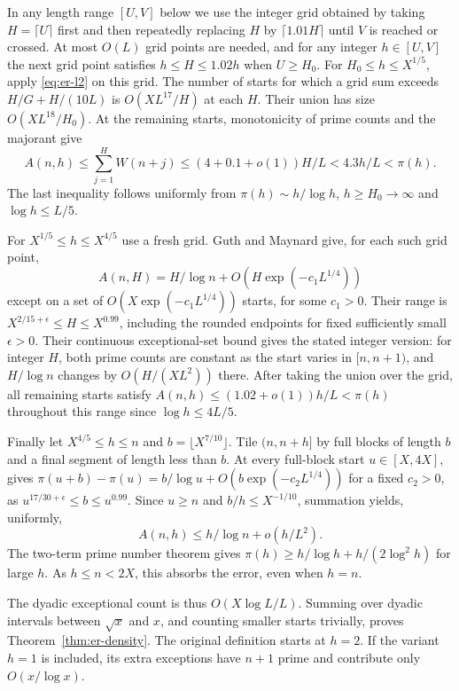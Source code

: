 \documentclass[11pt,a4paper]{article}
\begin{document}
In any length range $[U,V]$ below we use the integer grid obtained by
taking $H=\lceil U\rceil$ first and then repeatedly replacing $H$ by
$\lceil1.01H\rceil$ until $V$ is reached or crossed. At most $O(L)$
grid points are needed, and for any integer $h\in[U,V]$ the next grid
point satisfies $h\le H\le1.02h$ when $U\ge H_0$.
For $H_0\le h\le X^{1/5}$, apply \eqref{eq:er-l2} on this grid.
The number of starts for which a grid sum exceeds
$H/G+H/(10L)$ is $O(XL^{17}/H)$ at each $H$. Their union has size
$O(XL^{18}/H_0)$. At the remaining starts, monotonicity of prime counts
and the majorant give
\[
 A(n,h)\le \sum_{j=1}^H W(n+j)\le (4+0.1+o(1))H/L
       <4.3h/L<\pi(h).
\]
The last inequality follows uniformly from $\pi(h)\sim h/\log h$,
$h\ge H_0\to\infty$ and $\log h\le L/5$.

For $X^{1/5}\le h\le X^{4/5}$ use a fresh grid.
Guth and Maynard \cite[Corollary~1.4]{gm} give, for each such grid point,
\[
 A(n,H)=H/\log n+O(H\exp(-c_1 L^{1/4}))
\]
except on a set of $O(X\exp(-c_1 L^{1/4}))$ starts, for some $c_1>0$.
Their range is $X^{2/15+\epsilon}\le H\le X^{0.99}$, including the
rounded endpoints for fixed sufficiently small $\epsilon>0$. Their
continuous exceptional-set bound gives the stated integer version:
for integer $H$, both prime counts are constant as the start varies
in $[n,n+1)$, and $H/\log n$ changes by $O(H/(XL^2))$ there.
After taking the union over the grid, all remaining starts satisfy
$A(n,h)\le(1.02+o(1))h/L<\pi(h)$ throughout this range since
$\log h\le4L/5$.

Finally let $X^{4/5}\le h\le n$ and $b=\lfloor X^{7/10}\rfloor$.
Tile $(n,n+h]$ by full blocks of length $b$ and a final segment of
length less than $b$. At every full-block start $u\in[X,4X]$,
\cite[Corollary~1.3]{gm} gives
$\pi(u+b)-\pi(u)=b/\log u+O(b\exp(-c_2 L^{1/4}))$ for a fixed
$c_2>0$, as $u^{17/30+\epsilon}\le b\le u^{0.99}$.
Since $u\ge n$ and $b/h\le X^{-1/10}$, summation yields, uniformly,
\[
 A(n,h)\le h/\log n+o(h/L^2).
\]
The two-term prime number theorem gives
$\pi(h)\ge h/\log h+h/(2\log^2 h)$ for large $h$.
As $h\le n<2X$, this absorbs the error, even when $h=n$.

The dyadic exceptional count is thus $O(X\log L/L)$. Summing over
dyadic intervals between $\sqrt{x}$ and $x$, and counting smaller
starts trivially, proves Theorem~\ref{thm:er-density}. The original
definition starts at $h=2$. If the variant $h=1$ is included, its
extra exceptions have $n+1$ prime and contribute only $O(x/\log x)$.
\end{document}
